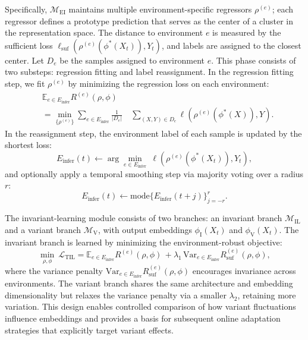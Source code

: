 ﻿\documentclass[journal]{IEEEtran}
\begin{document}
Specifically, $\mathcal{M}_{\mathrm{EI}}$ maintains multiple environment-specific regressors $\rho^{(e)}$; each regressor defines a prototype prediction that serves as the center of a cluster in the representation space. The distance to environment $e$ is measured by the sufficient loss $\ell_{\mathrm{suf}}(\rho^{(e)}(\phi^{*}(X_t)),Y_t)$, and labels are assigned to the closest center. Let $D_e$ be the samples assigned to environment $e$. This phase consists of two substeps: regression fitting and label reassignment. In the regression fitting step, we fit $\rho^{(e)}$ by minimizing the regression loss on each environment:
\begin{equation}
\begin{aligned}
&\mathbb{E}_{e\in E_{\mathrm{infer}}}R^{(e)}(\rho,\phi) \\
&= \min_{\{\rho^{(e)}\}}\sum_{e\in E_{\mathrm{infer}}}\frac{1}{|D_e|}
\quad \sum_{(X,Y)\in D_e}\ell\!\left(\rho^{(e)}(\phi^{*}(X)),Y\right).
\end{aligned}
\end{equation}
In the reassignment step, the environment label of each sample is updated by the shortest loss:
\begin{equation}
E_{\mathrm{infer}}(t)\leftarrow \arg\min_{e\in E_{\mathrm{infer}}}\ \ell\!\left(\rho^{(e)}(\phi^{*}(X_t)),Y_t\right),
\end{equation}
and optionally apply a temporal smoothing step via majority voting over a radius $r$:
\begin{equation}
E_{\mathrm{infer}}(t)\leftarrow \mathrm{mode}\{E_{\mathrm{infer}}(t+j)\}_{j=-r}^{r}.
\end{equation}

The invariant-learning module consists of two branches: an invariant branch $\mathcal{M}_{\mathrm{IL}}$ and a variant branch $\mathcal{M}_{\mathrm{V}}$, with output embeddings $\phi_{\mathrm{I}}(X_t)$ and $\phi_{\mathrm{V}}(X_t)$. The invariant branch is learned by minimizing the environment-robust objective:
\begin{equation}
\min_{\rho,\phi}\ \mathcal{L}_{\mathrm{TIL}}
=\mathbb{E}_{e\in E_{\mathrm{infer}}}R^{(e)}(\rho,\phi)
\,+\lambda_1\,\mathrm{Var}_{e\in E_{\mathrm{infer}}} R_{\mathrm{suf}}^{(e)}(\rho,\phi),
\end{equation}
where the variance penalty $\mathrm{Var}_{e\in E_{\mathrm{infer}}} R_{\mathrm{suf}}^{(e)}(\rho,\phi)$ encourages invariance across environments. The variant branch shares the same architecture and embedding dimensionality but relaxes the variance penalty via a smaller $\lambda_2$, retaining more variation. This design enables controlled comparison of how variant fluctuations influence embeddings and provides a basis for subsequent online adaptation strategies that explicitly target variant effects. 
\end{document}
